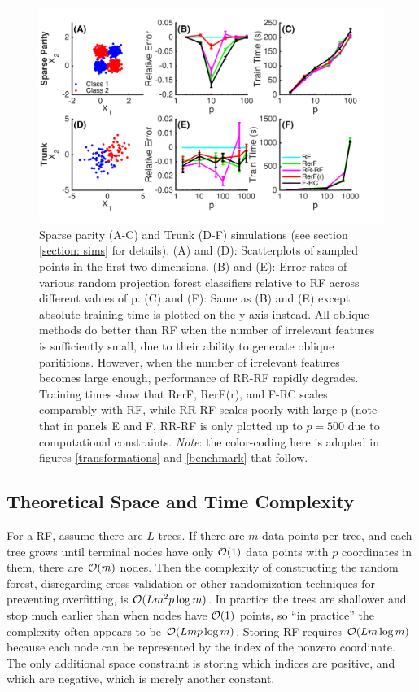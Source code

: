 \documentclass{article}
\begin{document}
\begin{figure}[ht]
\vskip 0.2in
\begin{center}
\centerline{\includegraphics[width=\columnwidth]{Fig2_simulations}}
\caption{Sparse parity (A-C) and Trunk (D-F) simulations (see section \ref{section: sims} for details). (A) and (D): Scatterplots of sampled points in the first two dimensions. (B) and (E): Error rates of various random projection forest classifiers relative to RF across different values of p. (C) and (F): Same as (B) and (E) except absolute training time is plotted on the y-axis instead. All oblique methods do better than RF when the number of irrelevant features is sufficiently small, due to their ability to generate oblique parititions. However, when the number of irrelevant features becomes large enough, performance of RR-RF rapidly degrades. Training times show that RerF, RerF(r), and F-RC scales comparably with RF, while RR-RF scales poorly with large p (note that in panels E and F, RR-RF is only plotted up to $p = 500$ due to computational constraints. \emph{Note}: the color-coding here is adopted in figures \ref{transformations} and \ref{benchmark} that follow.}
\label{simulations}
\end{center}
\vskip -0.2in
\end{figure}

\subsection{Theoretical Space and Time Complexity}

For a RF, assume there are $L$ trees. If there are $m$ data points per tree, and each tree grows until terminal nodes have only $\mathcal{O}(1)$ data points with $p$ coordinates in them, there are $\mathcal{O}(m)$ nodes.
Then the complexity of constructing the random forest, disregarding cross-validation or other randomization techniques for preventing overfitting, is $\mathcal{O}(Lm^2p\log m)$. In practice the trees are shallower and stop much earlier than when nodes have $\mathcal{O}(1)$ points, so ``in practice'' the complexity often appears to be $\mathcal{O}(Lmp\log m)$. Storing RF requires $\mathcal{O}(L m\log m)$ because each node can be represented by the index of the nonzero coordinate. The only additional space constraint is storing which indices are positive, and which are negative, which is merely another constant.
\end{document}

